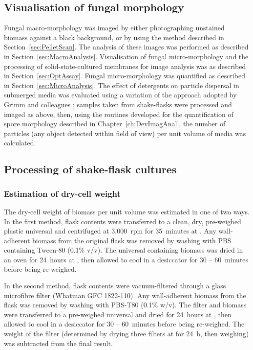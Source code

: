 \subsection{Visualisation of fungal morphology}

Fungal macro-morphology was imaged by either photographing unstained biomass against a black background, or by using the method described in Section~\ref{sec:PelletScan}. The analysis of these images was performed as described in Section~\ref{sec:MacroAnalysis}. Visualisation of fungal micro-morphology and the processing of solid-state-cultured membranes for image analysis was as described in Section~\ref{sec:OptAssay}. Fungal micro-morphology was quantified as described in Section~\ref{sec:MicroAnalysis}. The effect of detergents on particle dispersal in submerged media was evaluated using a variation of the approach adopted by Grimm and colleagues \cite{grimm2004}; samples taken from shake-flasks were processed and imaged as above, then, using the routines developed for the quantification of spore morphology described in Chapter~\ref{ch:DevImagAnal}, the number of particles (any object detected within field of view) per unit volume of media was calculated.

\subsection{Processing of shake-flask cultures}

\subsubsection{Estimation of dry-cell weight}

The dry-cell weight of biomass per unit volume was estimated in one of two ways. In the first method, flask contents were transferred to a clean, dry, pre-weighed plastic universal and centrifuged at 3,000~rpm for 35~minutes at . Any wall-adherent biomass from the original flask was removed by washing with PBS containing Tween-80 (0.1\% v/v). The universal containing biomass was dried in an oven for 24~hours at , then allowed to cool in a desiccator for 30 -- 60~minutes before being re-weighed.

In the second method, flask contents were vacuum-filtered through a glass microfibre filter (Whatman GFC 1822-110). Any wall-adherent biomass from the flask was removed by washing with PBS-T80 (0.1\% w/v). The filter and biomass were transferred to a pre-weighed universal and dried for 24~hours at , then allowed to cool in a desiccator for 30 -- 60~minutes before being re-weighed. The weight of the filter (determined by drying three filters at  for 24~h, then weighing) was subtracted from the final result.

